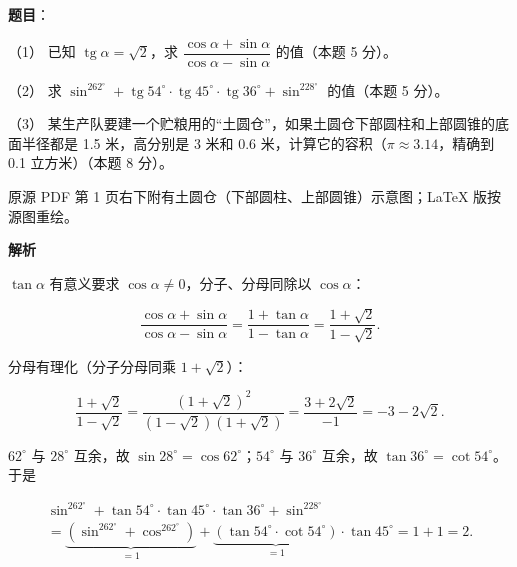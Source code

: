 \begin{answer}

\textbf{题目}：

（1） 已知 $\operatorname{tg}\alpha=\sqrt2$，求 $\dfrac{\cos\alpha+\sin\alpha}{\cos\alpha-\sin\alpha}$ 的值（本题 5 分）。

（2） 求 $\sin^262^\circ+\operatorname{tg}54^\circ\cdot\operatorname{tg}45^\circ\cdot\operatorname{tg}36^\circ+\sin^228^\circ$ 的值（本题 5 分）。

（3） 某生产队要建一个贮粮用的“土圆仓”，如果土圆仓下部圆柱和上部圆锥的底面半径都是 1.5 米，高分别是 3 米和 0.6 米，计算它的容积（$\pi\approx3.14$，精确到 0.1 立方米）（本题 8 分）。

\begin{gktip}
原源 PDF 第 1 页右下附有土圆仓（下部圆柱、上部圆锥）示意图；LaTeX 版按源图重绘。
\end{gktip}
\nopagebreak[4]
\begin{center}\end{center}
\nopagebreak[4]
\textbf{解析}


$\tan\alpha$ 有意义要求 $\cos\alpha\ne0$，分子、分母同除以 $\cos\alpha$：

\nopagebreak[4]
\[
\frac{\cos\alpha+\sin\alpha}{\cos\alpha-\sin\alpha}
=\frac{1+\tan\alpha}{1-\tan\alpha}
=\frac{1+\sqrt2}{1-\sqrt2}.
\]

分母有理化（分子分母同乘 $1+\sqrt2$）：

\nopagebreak[4]
\[
\frac{1+\sqrt2}{1-\sqrt2}
=\frac{(1+\sqrt2)^2}{(1-\sqrt2)(1+\sqrt2)}
=\frac{3+2\sqrt2}{-1}
=-3-2\sqrt2.
\]


$62^\circ$ 与 $28^\circ$ 互余，故 $\sin28^\circ=\cos62^\circ$；$54^\circ$ 与 $36^\circ$ 互余，故 $\tan36^\circ=\cot54^\circ$。于是

\nopagebreak[4]
\[
\begin{gathered}
\sin^262^\circ+\tan54^\circ\cdot\tan45^\circ\cdot\tan36^\circ+\sin^228^\circ\\
=\underbrace{\left(\sin^262^\circ+\cos^262^\circ\right)}_{=1}
+\underbrace{\left(\tan54^\circ\cdot\cot54^\circ\right)}_{=1}\cdot\tan45^\circ
=1+1=2.
\end{gathered}
\]



\end{answer}
